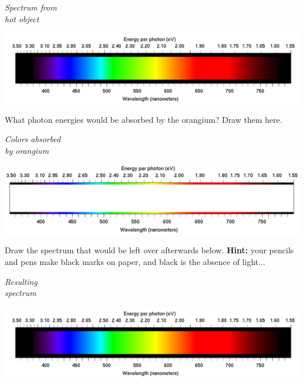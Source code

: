 \documentclass[11pt]{article}
\begin{document}
\begin{minipage}{0.15\textwidth}
	\begin{center}	\it Spectrum from\\
		hot object\end{center}
\end{minipage}
\begin{minipage}{0.8\textwidth}
	\includegraphics[width=5.5in]{spectrum-continuous.png}
\end{minipage}


What photon energies would be absorbed by the orangium? Draw them here.

\begin{minipage}{0.15\textwidth}
	\begin{center}	\it Colors absorbed\\
		by orangium\end{center}
\end{minipage}
\begin{minipage}{0.8\textwidth}
	\includegraphics[width=5.5in]{spectrum-blank.png}
\end{minipage}

Draw the spectrum that would be left over afterwards below. {\bf Hint:} your pencils and pens make black marks on paper, and black is the absence of light...

\begin{minipage}{0.15\textwidth}
	\begin{center}	\it Resulting \\ spectrum\end{center}
\end{minipage}
\begin{minipage}{0.8\textwidth}
	\includegraphics[width=5.5in]{spectrum-continuous.png}
\end{minipage}
\end{document}
